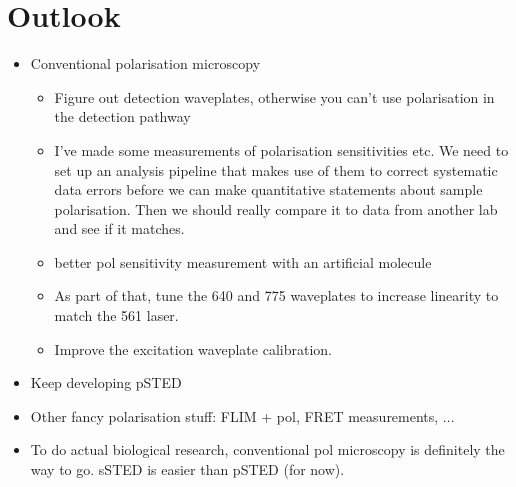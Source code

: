 
\chapter{Outlook}

\begin{itemize}
	\item Conventional polarisation microscopy
	\begin{itemize}
		\item Figure out detection waveplates, otherwise you can't use polarisation in the detection pathway
		
		\item I've made some measurements of polarisation sensitivities etc. We need to set up an analysis pipeline that makes use of them to correct systematic data errors before we can make quantitative statements about sample polarisation. Then we should really compare it to data from another lab and see if it matches. 
		\item better pol sensitivity measurement with an artificial molecule
		
		\item As part of that, tune the 640 and 775 waveplates to increase linearity to match the 561 laser.
		
		\item Improve the excitation waveplate calibration.		
	\end{itemize}

	\item Keep developing pSTED
	
	\item Other fancy polarisation stuff: FLIM + pol, FRET measurements, ...
	
	\item To do actual biological research, conventional pol microscopy is definitely the way to go. sSTED is easier than pSTED (for now).
\end{itemize}